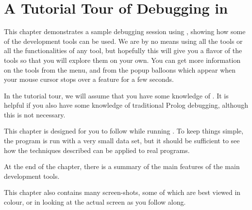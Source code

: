 %
% 
% 
% 
% 

\chapter{A Tutorial Tour of Debugging in {\tkeclipse}}
\label{chapdebug}
 

This chapter demonstrates a sample debugging session using
{\tkeclipse}, showing how some of the 
development tools can be used. We are by no means using all the tools  or
all the functionalities of any tool, but hopefully this will give you a
flavor of the tools so that you will explore them on your own. You can get
more information on the tools from the  menu, and from the popup
balloons which appear when your mouse cursor stops over a feature for
a few seconds. 

In the tutorial tour, we will assume that you have some knowledge of
{\eclipse}. It is helpful if you also have some knowledge of
traditional Prolog debugging, although this is not necessary.

This chapter is designed for you to follow while running {\tkeclipse}.
To keep things simple, the program is run with a very small
data set, but it should be sufficient to see how the techniques described
can be applied to real programs. 

At the end of the chapter, there is a summary of the main features of the
main development tools.

This chapter
also contains many screen-shots, some of which are best viewed in colour, or
in looking at the actual screen as you follow along.


